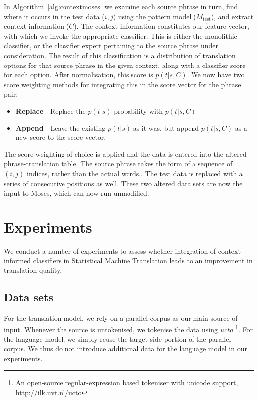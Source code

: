 \documentclass[smallextended]{svjour3}       %
\theoremstyle{break}
\begin{document}
In Algorithm~\ref{alg:contextmoses} we examine each source phrase in turn, find
where it occurs in the test data ($i,j$) using the pattern model
($M_{\text{test}}$), and extract context information ($C$). The context
information constitutes our feature vector, with which we invoke the
appropriate classifier. This is either the monolithic classifier, or the
classifier expert pertaining to the source phrase under consideration. The
result of this classification is a distribution of translation options for that
source phrase in the given context, along with a classifier score for each
option. After normalisation, this score is $p(t|s,C)$. We now have two score
weighting methods for integrating this in the score vector for the phrase pair:

\begin{itemize}
  \item \textbf{Replace} - Replace the $p(t|s)$ probability with $p(t|s,C)$
  \item \textbf{Append} - Leave the existing $p(t|s)$ as it was, but append
    $p(t|s,C)$ as a new score to the score vector.
\end{itemize}

The score weighting of choice is applied and the data is entered into the
altered phrase-translation table. The source phrase takes the form of a
sequence of $(i,j)$ indices, rather than the actual words..  The test data is
replaced with a series of consecutive positions as well. These two altered data
sets are now the input to Moses, which can now run unmodified. 



\section{Experiments}

We conduct a number of experiments to assess whether integration of
context-informed classifiers in Statistical Machine Translation leads to
an improvement in translation quality. 

\subsection{Data sets}

For the translation model, we rely on a parallel corpus as our main source of
input. Whenever the source is untokenised, we tokenise the data using
\emph{ucto} \footnote{An open-source regular-expression based tokeniser with
unicode support, \url{http://ilk.uvt.nl/ucto}}. For the language model, we
simply reuse the target-side portion of the parallel corpus. We thus do not
introduce additional data for the language model in our experiments.
\end{document}
